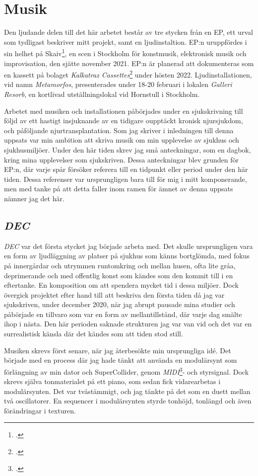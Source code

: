 \documentclass{article}
\begin{document}
\pagebreak
\section{Musik}
Den ljudande delen till det här arbetet består av tre stycken från en EP, ett urval som tydligast beskriver
mitt projekt, samt en ljudinstaltion. EP:n uruppfördes i sin helhet på Skaiv\footcite{skaiv}, en scen i
Stockholm för konstmusik, elektronisk musik och improvisation, den sjätte november 2021. EP:n är planerad att
dokumenteras som en kassett på bolaget \emph{Kalkatraz Cassettes}\footcite{kalkatraz} under hösten 2022.
Ljudinstallationen, vid namn \emph{Metamorfos}, presenterades under 18-20 februari i lokalen \emph{Galleri
Resorb}, en kortlivad utställningslokal vid Hornstull i Stockholm.

Arbetet med musiken och installationen påbörjades under en sjukskrivning till följd av ett hastigt
insjuknande av en tidigare oupptäckt kronisk njursjukdom, och påföljande njurtransplantation. Som jag skriver
i inledningen till denna uppsats var min ambition att skriva musik om min upplevelse av sjukhus och
sjukhusmiljöer. Under den här tiden skrev jag små anteckningar, som en dagbok, kring mina upplevelser som
sjukskriven. Dessa anteckningar blev grunden för EP:n, där varje spår försöker referera till en tidpunkt eller
period under den här tiden. Dessa referenser var ursprungligen bara till för mig i mitt komponerande, men med
tanke på att detta faller inom ramen för ämnet av denna uppsats nämner jag det här. 


\subsection{\emph{DEC}}\nocite{DEC}
\emph{DEC} var det första stycket jag började arbeta med. Det skulle ursprungligen vara en form av ljudläggning
av platser på sjukhus som känns bortglömda, med fokus på innergårdar och utrymmen runtomkring och mellan
husen, ofta lite gråa, deprimerande och med offentlig konst som kändes som den kommit till i en eftertanke. En
komposition om att spendera mycket tid i dessa miljöer. Dock övergick projektet efter hand till att beskriva
den första tiden då jag var sjukskriven, under december 2020, när jag abrupt pausade mina studier
och påbörjade en tillvaro som var en form av mellantillstånd, där varje dag smälte ihop i nästa. Den här
perioden saknade strukturen jag var van vid och det var en surrealistisk känsla där det kändes som att tiden
stod still.

Musiken skrevs först senare, när jag återbesökte min ursprungliga idé. Det började med en process där jag hade
tänkt att använda en modulärsynt som förlängning av min dator och SuperCollider, genom
\emph{MIDI}\footcite{midi}- och styrsignal. 
Dock skrevs själva tonmaterialet på ett piano, som sedan fick vidarearbetas i modulärsynten. Det var
tvåstämmigt, och jag tänkte på det som en duett mellan två oscillatorer. En sequencer i modulärsynten styrde 
tonhöjd, tonlängd och även förändringar i texturen. 
\end{document}
